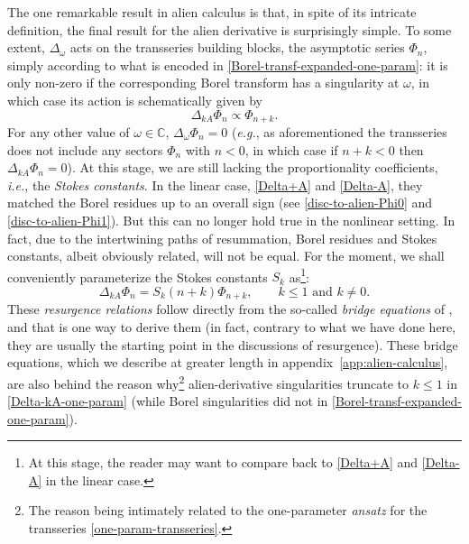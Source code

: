 \documentclass[11pt,a4paper]{article}
\newcommand{\be}{\begin{equation}}
\newcommand{\ee}{\end{equation}}
\begin{document}
The one remarkable result in alien calculus is that, in spite of its intricate definition, the final result for the alien derivative is surprisingly simple. To some extent, $\Delta_{\omega}$ acts on the transseries building blocks, the asymptotic series $\Phi_n$, simply according to what is encoded in \eqref{Borel-transf-expanded-one-param}: it is only non-zero if the corresponding Borel transform has a singularity at $\omega$, in which case its action is schematically given by
%
\be
\Delta_{k A} \Phi_n \propto \Phi_{n+k}.
\ee
%
\noindent
For any other value of $\omega \in \mathbb{C}$, $\Delta_{\omega} \Phi_n=0$ (\textit{e.g.}, as aforementioned the transseries does not include any sectors $\Phi_n$ with $n<0$, in which case if $n+k<0$ then $\Delta_{kA}\Phi_n=0$). At this stage, we are still lacking the proportionality coefficients, \textit{i.e.}, the \textit{Stokes constants}. In the linear case, \eqref{Delta+A} and \eqref{Delta-A}, they matched the Borel residues up to an overall sign (see \eqref{disc-to-alien-Phi0} and \eqref{disc-to-alien-Phi1}). But this can no longer hold true in the nonlinear setting. In fact, due to the intertwining paths of resummation, Borel residues and Stokes constants, albeit obviously related, will not be equal. For the moment, we shall conveniently parameterize the Stokes constants $S_k$ as\footnote{At this stage, the reader may want to compare back to \eqref{Delta+A} and \eqref{Delta-A} in the linear case.}:
%
\be
\label{Delta-kA-one-param}
\Delta_{k A} \Phi_n = S_{k} \left(n+k\right) \Phi_{n+k}, \qquad k \le 1 \text{  and  } k \neq 0.
\ee
%
\noindent
These \textit{resurgence relations} follow directly from the so-called \textit{bridge equations} of \cite{e81}, and that is one way to derive them (in fact, contrary to what we have done here, they are usually the starting point in the discussions of resurgence). These bridge equations, which we describe at greater length in appendix~\ref{app:alien-calculus}, are also behind the reason why\footnote{The reason being intimately related to the one-parameter \textit{ansatz} for the transseries \eqref{one-param-transseries}.} alien-derivative singularities truncate to $k \le 1$ in \eqref{Delta-kA-one-param} (while Borel singularities did not in \eqref{Borel-transf-expanded-one-param}). 
\end{document}
